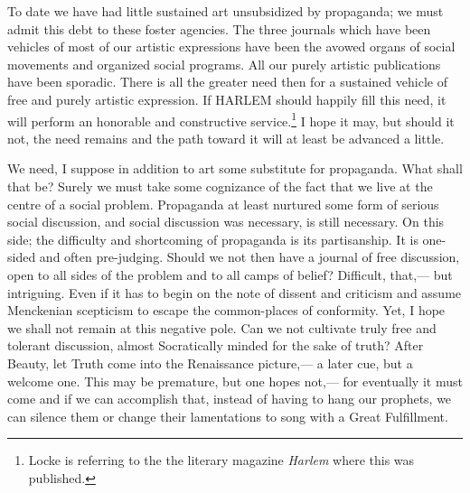 \documentclass[12pt]{article}
\begin{document}
To date we have had little sustained art unsubsidized by propaganda; we must admit this debt to these foster agencies. The three journals which have been vehicles of most of our artistic expressions have been the avowed organs of social movements and organized social programs. All our purely artistic publications have been sporadic. There is all the greater need then for a sustained vehicle of free and purely artistic expression. If HARLEM should happily fill this need, it will perform an honorable and constructive service.\footnote{Locke is referring to the the literary magazine \emph{Harlem} where this was published.} I hope it may, but should it not, the need remains and the path toward it will at least be advanced a little.

We need, I suppose in addition to art some substitute for propaganda. What shall that be? Surely we must take some cognizance of the fact that we live at the centre of a social problem. Propaganda at least nurtured some form of serious social discussion, and social discussion was necessary, is still necessary. On this side; the difficulty and shortcoming of propaganda is its partisanship. It is one-sided and often pre-judging. Should we not then have a journal of free discussion, open to all sides of the problem and to all camps of belief? Difficult, that,--- but intriguing. Even if it has to begin on the note of dissent and criticism and assume Menckenian scepticism to escape the common-places of conformity. Yet, I hope we shall not remain at this negative pole. Can we not cultivate truly free and tolerant discussion, almost Socratically minded for the sake of truth? After Beauty, let Truth come into the Renaissance picture,--- a later cue, but a welcome one. This may be premature, but one hopes not,--- for eventually it must come and if we can accomplish that, instead of having to hang our prophets, we can silence them or change their lamentations to song with a Great Fulfillment.
\end{document}
